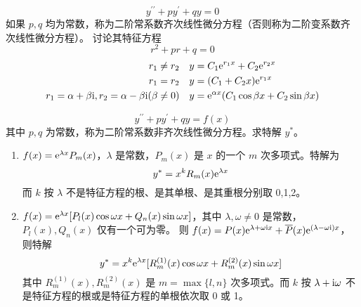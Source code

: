 \documentclass{ctexbook}
\def\e{\textnormal{e}}
\begin{document}
\begin{definition}[二阶常系数齐次线性微分方程]
    \begin{equation}
        y^{\prime\prime}+py^\prime+qy=0
    \end{equation}
    如果 $p,q$ 均为常数，称为二阶常系数齐次线性微分方程（否则称为二阶变系数齐次线性微分方程）。
    讨论其特征方程
    \begin{equation}
        r^2+pr+q=0
    \end{equation}
    \begin{align}
        r_1\neq r_2 && y&=C_1\e^{r_1x}+C_2\e^{r_2x}\\
        r_1=r_2 && y&=(C_1+C_2x)\e^{r_1x}\\
        r_1=\alpha+\beta\textnormal{i},r_2=\alpha-\beta\textnormal{i}(\beta\neq 0) && y&=\e^{\alpha x}(C_1\cos\beta x+C_2\sin\beta x)
    \end{align}
\end{definition}

\begin{definition}[二阶常系数非齐次线性微分方程]
    \begin{equation}
        y^{\prime\prime}+py^\prime+qy=f(x)
    \end{equation}
    其中 $p,q$ 为常数，称为二阶常系数非齐次线性微分方程。求特解 $y^*$。
    \begin{enumerate}
        \item $f(x)=\e^{\lambda x}P_m(x)$，$\lambda$ 是常数，$P_m(x)$ 是 $x$ 的一个 $m$ 次多项式。特解为 
        \begin{equation}
            y^*=x^kR_m(x)\e^{\lambda x}
        \end{equation}
        而 $k$ 按 $\lambda$ 不是特征方程的根、是其单根、是其重根分别取 0,1,2。
        \item $f(x)=\e^{\lambda x}[P_l(x)\cos\omega x+Q_n(x)\sin\omega x]$，其中 $\lambda,\omega\neq 0$ 是常数，$P_l(x),Q_n(x)$ 仅有一个可为零。
        则 $f(x)=P(x)\e^{\lambda+\omega\textnormal{i}x}+\overline{P}(x)\e^{(\lambda-\omega\textnormal{i})x}$，则特解
        \begin{equation}
            y^*=x^k\e^{\lambda x}[R_m^{(1)}(x)\cos\omega x+R_m^{(2)}(x)\sin\omega x]
        \end{equation}
        其中 $R_m^{(1)}(x),R_m^{(2)}(x)$ 是 $m=\max\{l,n\}$ 次多项式。而 $k$ 按 $\lambda+\textnormal{i}\omega$ 不是特征方程的根或是特征方程的单根依次取 0 或 1。
    \end{enumerate}
\end{definition}
\end{document}
